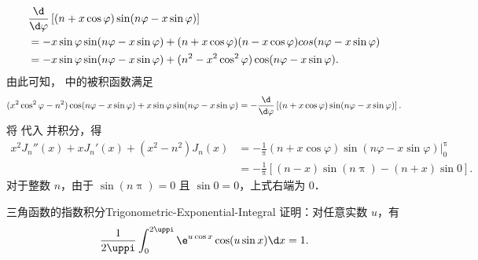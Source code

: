 \begin{myproof}
\begin{equation}
\begin{aligned}
             & \frac{\d}{\d \varphi} \left[ (n + x \cos \varphi) \sin(n\varphi - x \sin \varphi) \right]                                    \\
             & = -x \sin \varphi \sin(n\varphi - x \sin \varphi) + (n + x \cos \varphi )(n - x \cos \varphi) cos(n\varphi - x \sin \varphi) \\
             & = -x \sin \varphi \sin(n\varphi - x \sin \varphi) + (n^2 - x^2 \cos^2 \varphi) \cos(n\varphi - x \sin \varphi).
        \end{aligned}
    \end{equation}
    由此可知， 中的被积函数满足
    \begin{equation}\label{eq:bessel-integrand-rewrite}
        (x^2 \cos^2 \varphi - n^2) \cos(n\varphi - x \sin \varphi) + x \sin \varphi \sin(n\varphi - x \sin \varphi) = -\frac{\d}{\d\varphi} \left[ (n + x \cos \varphi) \sin(n\varphi - x \sin \varphi) \right].
    \end{equation}
    将  代入  并积分，得
    \begin{equation}\label{eq:bessel-result}
        \begin{aligned}
            x^2 J_n''(x) + x J_n'(x) + (x^2 - n^2) J_n(x)
             & = -\frac{1}{\uppi} \left. (n + x \cos \varphi) \sin(n\varphi - x \sin \varphi) \right|_0^{\uppi} \\
             & = -\frac{1}{\uppi} \left[ (n - x) \sin(n\uppi) - (n + x) \sin 0 \right].
        \end{aligned}
    \end{equation}
    对于整数 $n$，由于 $\sin(n\uppi) = 0$ 且 $\sin 0 = 0$，上式右端为 $0$．
\end{myproof}

\begin{problem}{三角函数的指数积分}{Trigonometric-Exponential-Integral}
    证明：对任意实数 $u$，有
    \begin{equation}\label{eq:q5-target-1}
        \frac{1}{2 \uppi} \int_0^{2 \uppi} \e^{u \cos x} \cos(u \sin x) \d x = 1.
    \end{equation}
\end{problem}

